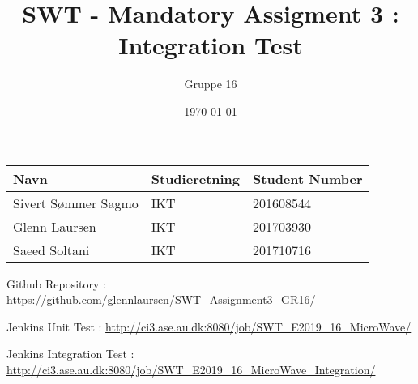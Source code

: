 \documentclass{article}
\title{SWT - Mandatory Assigment 3 : Integration Test}
\author{Gruppe 16}
\date{\today}
\begin{document}
\maketitle

\begin{table}[H]
\centering
\begin{tabular}{|l|l|l|}
\hline
\textbf{Navn}       & \textbf{Studieretning} & \textbf{Student Number} \\ \hline
Sivert Sømmer Sagmo & IKT                    & 201608544             \\ \hline
Glenn Laursen & IKT                    & 201703930             \\ \hline
Saeed Soltani & IKT                    & 201710716             \\ \hline
\end{tabular}
\end{table}

Github Repository : \url{https://github.com/glennlaursen/SWT_Assignment3_GR16/}

Jenkins Unit Test : \url{http://ci3.ase.au.dk:8080/job/SWT_E2019_16_MicroWave/}

Jenkins Integration Test : \url{http://ci3.ase.au.dk:8080/job/SWT_E2019_16_MicroWave_Integration/}

\tableofcontents
\pagebreak











%
%
\end{document}
